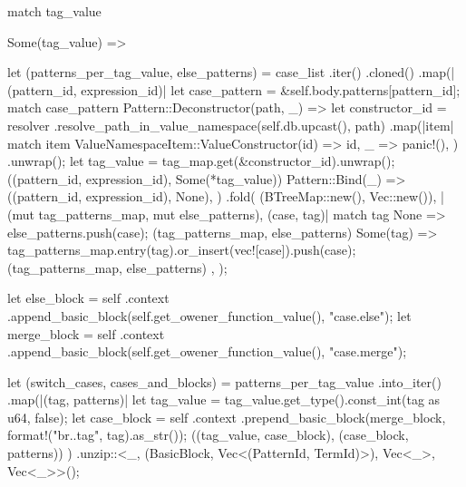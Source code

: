 \documentclass[
  oneside,
  english,
  coorientadorbanca,
  noabntexcite
]{ufsc-thesis-rn46-2019}
\begin{document}
\begin{rustcode}
{{        match tag_value {
            Some(tag_value) => {
                let (patterns_per_tag_value, else_patterns) = case_list
                    .iter()
                    .cloned()
                    .map(|(pattern_id, expression_id)| {
                        let case_pattern = &self.body.patterns[pattern_id];
                        match case_pattern {
                            Pattern::Deconstructor(path, _) => {
                                let constructor_id = resolver
                                    .resolve_path_in_value_namespace(self.db.upcast(), path)
                                    .map(|item| match item {
                                        ValueNamespaceItem::ValueConstructor(id) => id,
                                        _ => panic!(),
                                    })
                                    .unwrap();
                                let tag_value = tag_map.get(&constructor_id).unwrap();
                                ((pattern_id, expression_id), Some(*tag_value))
                            }
                            Pattern::Bind(_) => ((pattern_id, expression_id), None),
                        }
                    })
                    .fold(
                        (BTreeMap::new(), Vec::new()),
                        |(mut tag_patterns_map, mut else_patterns), (case, tag)| match tag {
                            None => {
                                else_patterns.push(case);
                                (tag_patterns_map, else_patterns)
                            }
                            Some(tag) => {
                                tag_patterns_map.entry(tag).or_insert(vec![case]).push(case);
                                (tag_patterns_map, else_patterns)
                            }
                        },
                    );

                let else_block = self
                    .context
                    .append_basic_block(self.get_owener_function_value(), "case.else");
                let merge_block = self
                    .context
                    .append_basic_block(self.get_owener_function_value(), "case.merge");

                let (switch_cases, cases_and_blocks) = patterns_per_tag_value
                    .into_iter()
                    .map(|(tag, patterns)| {
                        let tag_value = tag_value.get_type().const_int(tag as u64, false);
                        let case_block = self
                            .context
                            .prepend_basic_block(merge_block, format!("br.{}.tag", tag).as_str());
                        ((tag_value, case_block), (case_block, patterns))
                    })
                    .unzip::<_, (BasicBlock, Vec<(PatternId, TermId)>), Vec<_>, Vec<_>>();

}}}}
\end{rustcode}
\end{document}
